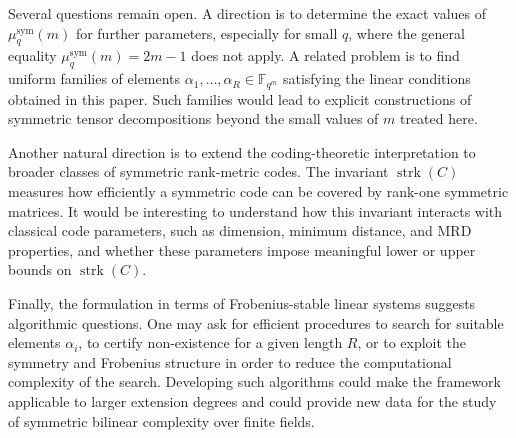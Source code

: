 \documentclass[11pt,a4paper,reqno]{article}
\numberwithin{equation}{section}
\theoremstyle{definition}
\begin{document}
Several questions remain open. A direction is to determine the exact
values of~\(\mu_q^{\mathrm{sym}}(m)\) for further parameters, especially
for small \(q\), where the general equality \(\mu_q^{\mathrm{sym}}(m)=2m-1\)
does not apply. A related problem is to find uniform families of elements
\(\alpha_1,\ldots,\alpha_R\in \mathbb F_{q^m}\) satisfying the linear
conditions obtained in this paper. Such families would lead to explicit
constructions of symmetric tensor decompositions beyond the small values
of \(m\) treated here.

Another natural direction is to extend the coding-theoretic interpretation
to broader classes of symmetric rank-metric codes. The invariant
\(\operatorname{strk}(C)\) measures how efficiently a symmetric code can be
covered by rank-one symmetric matrices. It would be interesting to
understand how this invariant interacts with classical code parameters,
such as dimension, minimum distance, and MRD properties, and whether these
parameters impose meaningful lower or upper bounds on
\(\operatorname{strk}(C)\).

Finally, the formulation in terms of Frobenius-stable linear systems
suggests algorithmic questions. One may ask for efficient procedures to
search for suitable elements \(\alpha_i\), to certify non-existence for a
given length \(R\), or to exploit the symmetry and Frobenius structure in
order to reduce the computational complexity of the search. Developing
such algorithms could make the framework applicable to larger extension
degrees and could provide new data for the study of symmetric bilinear
complexity over finite fields.

\bigskip


\end{document}
